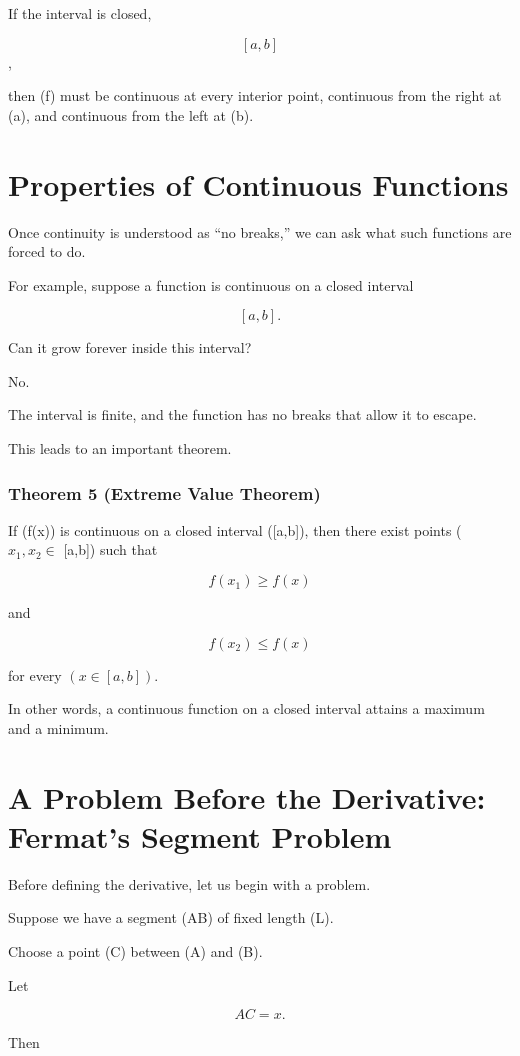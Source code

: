 If the interval is closed,

\[
[a,b]
\],

then (f) must be continuous at every interior point, continuous from the right at (a), and continuous from the left at (b).

\section{Properties of Continuous Functions}

Once continuity is understood as ``no breaks,'' we can ask what such functions are forced to do.

For example, suppose a function is continuous on a closed interval

\[
[a,b].
\]

Can it grow forever inside this interval?

No.

The interval is finite, and the function has no breaks that allow it to escape.

This leads to an important theorem.

\subsubsection*{Theorem 5 (Extreme Value Theorem)}

If (f(x)) is continuous on a closed interval ([a,b]), then there exist points ($x_1,x_2 \in$ [a,b]) such that

\[
f(x_1)\geq f(x)
\]

and

\[
f(x_2)\leq f(x)
\]

for every $(x\in [a,b])$.

In other words, a continuous function on a closed interval attains a maximum and a minimum.

\section{A Problem Before the Derivative: Fermat's Segment Problem}

Before defining the derivative, let us begin with a problem.

Suppose we have a segment (AB) of fixed length (L).

Choose a point (C) between (A) and (B).

Let

\[
AC=x.
\]

Then

